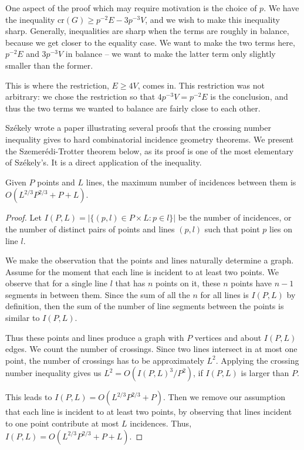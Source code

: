 \documentclass[11pt,paper=letter]{scrartcl}
\newcommand{\crs}[1]{\mathrm{cr}(#1)}
\begin{document}
One aspect of the proof which may require motivation is the choice of $p$. We have the inequality $\crs{G} \geq p^{-2}E - 3p^{-3}V$, and we wish to make this inequality sharp. Generally, inequalities are sharp when the terms are roughly in balance, because we get closer to the equality case. We want to make the two terms here, $p^{-2}E$ and $3p^{-3}V$ in balance -- we want to make the latter term only slightly smaller than the former.

This is where the restriction, $E \geq 4V$, comes in. This restriction was not arbitrary: we chose the restriction so that $4p^{-3}V = p^{-2}E$ is the conclusion, and thus the two terms we wanted to balance are fairly close to each other.

Sz\'{e}kely wrote a paper illustrating several proofs that the crossing number inequality gives to hard combinatorial incidence geometry theorems. \cite{szekely} We present the Szemer\'{e}di-Trotter theorem below, as its proof is one of the most elementary of Sz\'{e}kely's. It is a direct application of the inequality.

\begin{theorem}
Given $P$ points and $L$ lines, the maximum number of incidences between them is $O(L^{2/3}P^{2/3} + P + L)$.
\end{theorem}

\begin{proof}
Let $I(P, L) = |\{(p, l) \in P \times L : p \in l\}|$ be the number of incidences, or the number of distinct pairs of points and lines $(p, l)$ such that point $p$ lies on line $l$.

We make the observation that the points and lines naturally determine a graph. Assume for the moment that each line is incident to at least two points. We observe that for a single line $l$ that has $n$ points on it, these $n$ points have $n-1$ segments in between them. Since the sum of all the $n$ for all lines is $I(P, L)$ by definition, then the sum of the number of line segments between the points is similar to $I(P, L)$.

Thus these points and lines produce a graph with $P$ vertices and about $I(P, L)$ edges. We count the number of crossings. Since two lines intersect in at most one point, the number of crossings has to be approximately $L^2$. Applying the crossing number inequality gives us $L^2 = O(I(P, L)^3 / P^2)$, if $I(P, L)$ is larger than $P$.

This leads to $I(P, L) = O(L^{2/3}P^{2/3} + P)$. Then we remove our assumption that each line is incident to at least two points, by observing that lines incident to one point contribute at most $L$ incidences. Thus, $I(P, L) = O(L^{2/3}P^{2/3} + P + L)$.
\end{proof}
\end{document}
